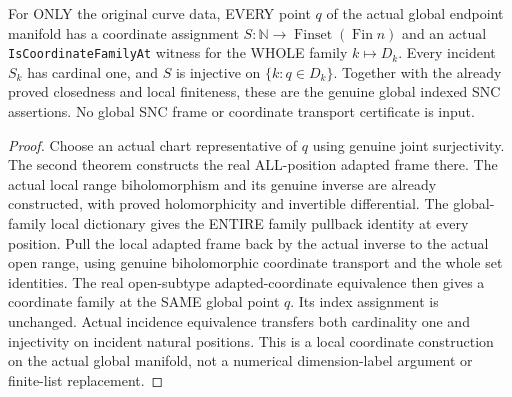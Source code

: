 \begin{theorem}
\label{hir:sharp-actual-global-indexed-boundary-snc-coordinates}
\leanok
For ONLY the original curve data, EVERY point $q$ of the actual global
endpoint manifold has a coordinate assignment
$S:\mathbb N\to\operatorname{Finset}(\operatorname{Fin}n)$ and an actual
\texttt{IsCoordinateFamilyAt} witness for the WHOLE family $k\mapsto D_k$.
Every incident $S_k$ has cardinal one, and $S$ is injective on
$\{k:q\in D_k\}$. Together with the already proved closedness and
local finiteness, these are the genuine global indexed SNC assertions.
No global SNC frame or coordinate transport certificate is input.
\end{theorem}
\begin{proof}
Choose an actual chart representative of $q$ using genuine joint
surjectivity. The second theorem constructs the real ALL-position
adapted frame there. The actual local range biholomorphism and its
genuine inverse are already constructed, with proved holomorphicity
and invertible differential. The global-family local dictionary gives
the ENTIRE family pullback identity at every position. Pull the local
adapted frame back by the actual inverse to the actual open range,
using genuine biholomorphic coordinate transport and the whole set
identities. The real open-subtype adapted-coordinate equivalence then
gives a coordinate family at the SAME global point $q$. Its index
assignment is unchanged. Actual incidence equivalence transfers both
cardinality one and injectivity on incident natural positions.
This is a local coordinate construction on the actual global manifold,
not a numerical dimension-label argument or finite-list replacement.
\end{proof}


